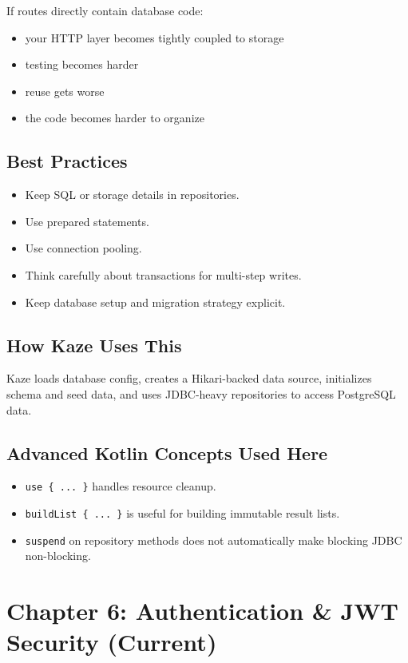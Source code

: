 \documentclass[11pt,a4paper]{article}
\begin{document}
If routes directly contain database code:
\begin{itemize}
    \item your HTTP layer becomes tightly coupled to storage
    \item testing becomes harder
    \item reuse gets worse
    \item the code becomes harder to organize
\end{itemize}

\subsection{Best Practices}

\begin{itemize}
    \item Keep SQL or storage details in repositories.
    \item Use prepared statements.
    \item Use connection pooling.
    \item Think carefully about transactions for multi-step writes.
    \item Keep database setup and migration strategy explicit.
\end{itemize}

\subsection{How Kaze Uses This}

Kaze loads database config, creates a Hikari-backed data source, initializes schema and seed data, and uses JDBC-heavy repositories to access PostgreSQL data.

\subsection{Advanced Kotlin Concepts Used Here}

\begin{itemize}
    \item \texttt{use \{ ... \}} handles resource cleanup.
    \item \texttt{buildList \{ ... \}} is useful for building immutable result lists.
    \item \texttt{suspend} on repository methods does not automatically make blocking JDBC non-blocking.
\end{itemize}

\section{Chapter 6: Authentication \& JWT Security (Current)}
\end{document}
